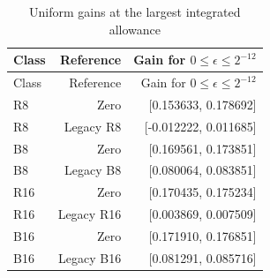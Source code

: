 {\footnotesize\setlength{\tabcolsep}{3pt}
\begin{longtable}{lrr}
\caption{Uniform gains at the largest integrated allowance}\label{tab:own-all83}\\
\hline
Class & Reference & Gain for $0\le\epsilon\le2^{-12}$ \\
\hline
\endfirsthead
\hline
Class & Reference & Gain for $0\le\epsilon\le2^{-12}$ \\
\hline
\endhead
R8 & Zero & [0.153633, 0.178692] \\
R8 & Legacy R8 & [-0.012222, 0.011685] \\
B8 & Zero & [0.169561, 0.173851] \\
B8 & Legacy B8 & [0.080064, 0.083851] \\
R16 & Zero & [0.170435, 0.175234] \\
R16 & Legacy R16 & [0.003869, 0.007509] \\
B16 & Zero & [0.171910, 0.176851] \\
B16 & Legacy B16 & [0.081291, 0.085716] \\
\hline\end{longtable}}
